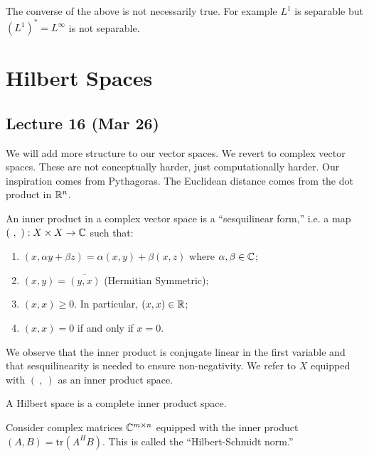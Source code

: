 \documentclass[10pt, twoside]{article}
\begin{document}
    \begin{rmk}
        The converse of the above is not necessarily true. For example $L^1$ is separable but $(L^1)^* = L^{\infty}$ is not separable.
    \end{rmk}

    \section{Hilbert Spaces}
    \subsection{Lecture 16 (Mar 26)}

    We will add more structure to our vector spaces. We revert to complex vector spaces. These are not conceptually harder, just computationally harder. Our inspiration comes from Pythagoras. The Euclidean distance comes from the dot product in $\mathbb{R}^n$.

    \begin{defn}
        An inner product in a complex vector space is a ``sesquilinear form,'' i.e. a map $(\ ,\ ): X \times X \to \mathbb{C}$ such that:
        \begin{enumerate}
            \item $(x, \alpha y + \beta z) = \alpha(x,y) + \beta(x,z)$ where $\alpha, \beta \in \mathbb{C}$;
            \item $(x,y) = \overline{(y,x)}$ (Hermitian Symmetric);
            \item $(x,x) \geq 0$. In particular, $(x,x) \in \mathbb{R}$;
            \item $(x,x) = 0$ if and only if $x = 0$.
        \end{enumerate}
    \end{defn}

    We observe that the inner product is conjugate linear in the first variable and that sesquilinearity is needed to ensure non-negativity. We refer to $X$ equipped with $(\ , \ )$ as an inner product space.

    \begin{defn}
        A Hilbert space is a complete inner product space.
    \end{defn}

    \begin{exm}
        Consider complex matrices $\mathbb{C}^{m \times n}$ equipped with the inner product $(A,B) = \mathrm{tr}(A^HB)$. This is called the ``Hilbert-Schmidt norm.''
    \end{exm}
\end{document}
